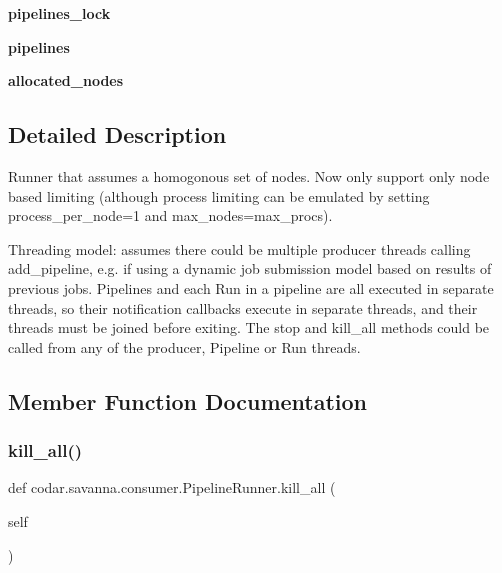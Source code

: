 \begin{DoxyCompactItemize}
{\bfseries pipelines\+\_\+lock}
\item 
\mbox{\label{classcodar_1_1savanna_1_1consumer_1_1_pipeline_runner_a6a9ac146d408fed1b635cf1d6c3adb5a}} 
{\bfseries pipelines}
\item 
\mbox{\label{classcodar_1_1savanna_1_1consumer_1_1_pipeline_runner_ae8fbcca12ce0cc295d8304c6e9daea5f}} 
{\bfseries allocated\+\_\+nodes}
\end{DoxyCompactItemize}


\subsection{Detailed Description}
\begin{DoxyVerb}Runner that assumes a homogonous set of nodes. Now only support only
node based limiting (although process limiting can be emulated by setting
process_per_node=1 and max_nodes=max_procs).

Threading model: assumes there could be multiple producer threads calling
add_pipeline, e.g. if using a dynamic job submission model based on
results of previous jobs. Pipelines and each Run in a pipeline are all
executed in separate threads, so their notification callbacks execute in
separate threads, and their threads must be joined before exiting. The
stop and kill_all methods could be called from any of the producer,
Pipeline or Run threads.\end{DoxyVerb}
 

\subsection{Member Function Documentation}
\mbox{\label{classcodar_1_1savanna_1_1consumer_1_1_pipeline_runner_a5d7432a5e1b57fa669dbc7391de3c881}} 
\subsubsection{\texorpdfstring{kill\+\_\+all()}{kill\_all()}}
{\footnotesize\ttfamily def codar.\+savanna.\+consumer.\+Pipeline\+Runner.\+kill\+\_\+all (\begin{DoxyParamCaption}\item[{}]{self }\end{DoxyParamCaption})}

